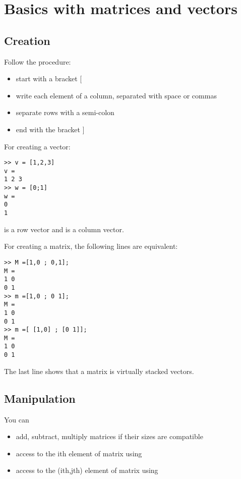 \section{Basics with matrices and vectors}



\subsection{Creation}
Follow the procedure:
\begin{itemize}
	\item start with a bracket [
	\item write each element of a column, separated with space or commas
	\item separate rows with a semi-colon
	\item end with the bracket ]
\end{itemize}


For creating a vector:

\begin{lstlisting}
>> v = [1,2,3]
v =
1 2 3
>> w = [0;1]
w =
0
1
\end{lstlisting}
 is a row vector and  is a column vector.

For creating a matrix, the following lines are equivalent:
\begin{lstlisting}
>> M =[1,0 ; 0,1];
M = 
1 0
0 1
>> m =[1,0 ; 0 1];
M = 
1 0
0 1
>> m =[ [1,0] ; [0 1]];
M = 
1 0
0 1
\end{lstlisting}

The last line shows that a matrix is virtually stacked vectors.

\subsection{Manipulation}
You can
\begin{itemize}
	\item add, subtract, multiply matrices if their sizes are compatible
	\item access to the ith element of matrix  using 
	\item access to the (ith,jth) element of matrix  using 
\end{itemize}	



